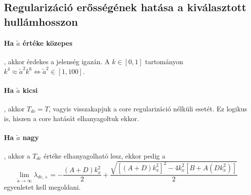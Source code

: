 \documentclass[10pt,a4paper]{scrartcl}
\begin{document}
\subsection{Regularizáció erősségének hatása a kiválasztott hullámhosszon}
\paragraph{Ha $\tilde a$ értéke közepes}, akkor érdekes a jelenség igazán. A $k \in \left[ {0,1} \right]$ tartományon ${k^4} \approx {\tilde a^2}{k^6} \Leftrightarrow {\tilde a^2} \in \left[ {1,100} \right]$.

\paragraph{Ha $\tilde a$ kicsi}, akkor ${T_{dc}} = T$, vagyis visszakapjuk a core regularizáció nélküli esetét. Ez logikus is, hiszen a core hatását elhanyagoltuk ekkor. 

\paragraph{Ha $\tilde a$ nagy}, akkor a ${T_{dc}}$ értéke elhanyagolható lesz, ekkor pedig a
\[\mathop {\lim }\limits_{\tilde a \to \infty } {\lambda _{dc, + }} =  - \frac{{\left( {A + D} \right)k_x^2}}{2} + \frac{{\sqrt {{{\left[ {\left( {A + D} \right)k_x^2} \right]}^2} - 4k_x^2\left[ {B + A\left( {Dk_x^2} \right)} \right]} }}{2}\]
egyenletet kell megoldani.
\end{document}

